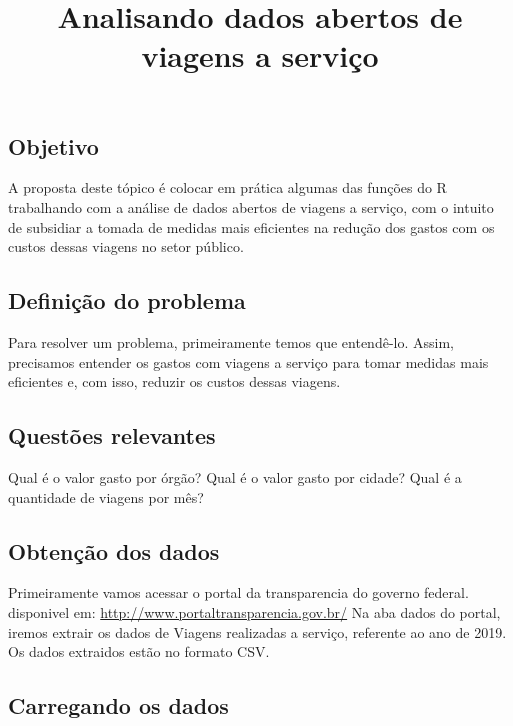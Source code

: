 \documentclass[
]{article}
\title{Analisando dados abertos de viagens a serviço}
\author{}
\date{\vspace{-2.5em}}
\begin{document}
\maketitle

\hypertarget{objetivo}{%
\subsection{Objetivo}\label{objetivo}}

A proposta deste tópico é colocar em prática algumas das funções do R
trabalhando com a análise de dados abertos de viagens a serviço, com o
intuito de subsidiar a tomada de medidas mais eficientes na redução dos
gastos com os custos dessas viagens no setor público.

\hypertarget{definiuxe7uxe3o-do-problema}{%
\subsection{Definição do problema}\label{definiuxe7uxe3o-do-problema}}

Para resolver um problema, primeiramente temos que entendê-lo. Assim,
precisamos entender os gastos com viagens a serviço para tomar medidas
mais eficientes e, com isso, reduzir os custos dessas viagens.

\hypertarget{questuxf5es-relevantes}{%
\subsection{Questões relevantes}\label{questuxf5es-relevantes}}

Qual é o valor gasto por órgão? Qual é o valor gasto por cidade? Qual é
a quantidade de viagens por mês?

\hypertarget{obtenuxe7uxe3o-dos-dados}{%
\subsection{Obtenção dos dados}\label{obtenuxe7uxe3o-dos-dados}}

Primeiramente vamos acessar o portal da transparencia do governo
federal. disponivel em: \url{http://www.portaltransparencia.gov.br/} Na
aba dados do portal, iremos extrair os dados de Viagens realizadas a
serviço, referente ao ano de 2019. Os dados extraidos estão no formato
CSV.

\hypertarget{carregando-os-dados}{%
\subsection{Carregando os dados}\label{carregando-os-dados}}
\end{document}
